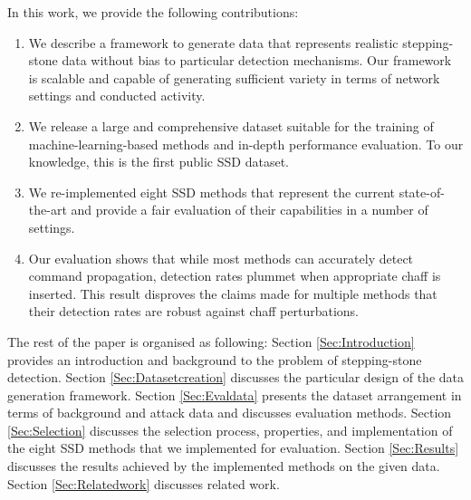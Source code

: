 \documentclass[runningheads,11pt]{llncs}\usepackage[]{graphicx}\usepackage[]{color}
\begin{document}
In this work, we provide the following contributions:

\begin{enumerate}
\item We describe a framework to generate data that represents realistic stepping-stone data without bias to particular detection mechanisms. Our framework is scalable and capable of generating sufficient variety in terms of network settings and conducted activity. 
\item We release a large and comprehensive dataset suitable for the training of machine-learning-based methods and in-depth performance evaluation. To our knowledge, this is the first public SSD dataset.
\item We re-implemented eight SSD methods that represent the current state-of-the-art and provide a fair evaluation of their capabilities in a number of settings. 
\item Our evaluation shows that while most methods can accurately detect command propagation, detection rates plummet when appropriate chaff is inserted. This result disproves the claims made for multiple methods that their detection rates are robust against chaff perturbations.
\end{enumerate} %

The rest of the paper is organised as following: Section \ref{Sec:Introduction} provides an introduction and background to the problem of stepping-stone detection. Section \ref{Sec:Datasetcreation} discusses the particular design of the data generation framework.
Section \ref{Sec:Evaldata} presents the dataset arrangement in terms of background and attack data and discusses evaluation methods. Section \ref{Sec:Selection} discusses the selection process, properties, and implementation of the eight SSD methods that we implemented for evaluation. Section \ref{Sec:Results} discusses the results achieved by the implemented methods on the given data. Section \ref{Sec:Relatedwork} discusses related work.
\end{document}
